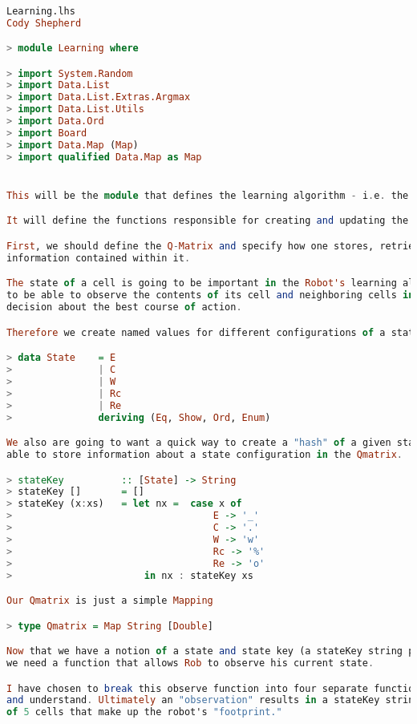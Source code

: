 \documentclass[12pt,a4paper]{article}
\begin{document}
	\begin{lstlisting}[language=Haskell,numbers=none,basicstyle=\tiny]

Learning.lhs
Cody Shepherd

> module Learning where

> import System.Random
> import Data.List
> import Data.List.Extras.Argmax
> import Data.List.Utils
> import Data.Ord
> import Board
> import Data.Map (Map)
> import qualified Data.Map as Map


This will be the module that defines the learning algorithm - i.e. the math part.

It will define the functions responsible for creating and updating the Q-Matrix

First, we should define the Q-Matrix and specify how one stores, retrieves, and updates
information contained within it.

The state of a cell is going to be important in the Robot's learning algorithm. The robot needs
to be able to observe the contents of its cell and neighboring cells in order to make a
decision about the best course of action.

Therefore we create named values for different configurations of a state.

> data State    = E
>               | C
>               | W 
>               | Rc
>               | Re
>               deriving (Eq, Show, Ord, Enum)

We also are going to want a quick way to create a "hash" of a given state signature for being
able to store information about a state configuration in the Qmatrix.

> stateKey          :: [State] -> String
> stateKey []       = []
> stateKey (x:xs)   = let nx =  case x of
>                                   E -> '_'
>                                   C -> '.'
>                                   W -> 'w'
>                                   Rc -> '%'
>                                   Re -> 'o'
>                       in nx : stateKey xs

Our Qmatrix is just a simple Mapping

> type Qmatrix = Map String [Double]

Now that we have a notion of a state and state key (a stateKey string plus a list of five Double values),
we need a function that allows Rob to observe his current state.

I have chosen to break this observe function into four separate functions to make it easier to manage
and understand. Ultimately an "observation" results in a stateKey string representing the configuration
of 5 cells that make up the robot's "footprint."


\end{lstlisting}
\end{document}
